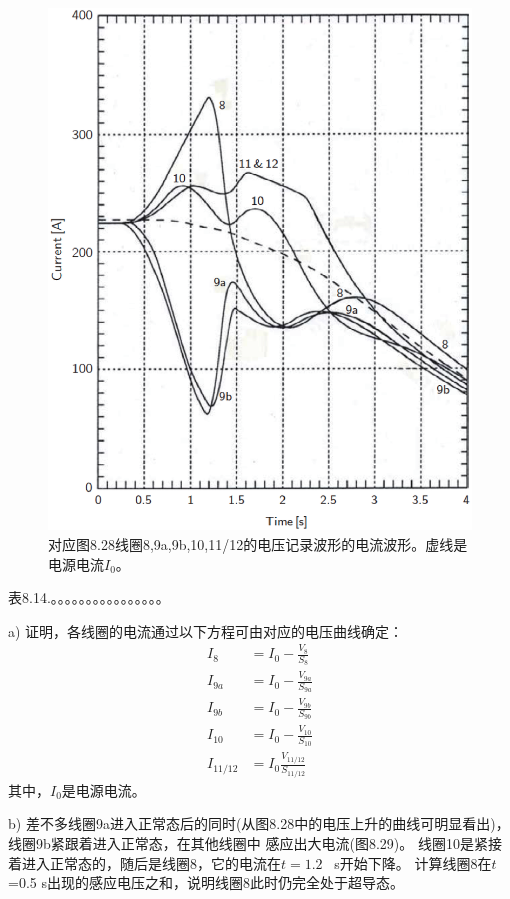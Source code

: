 \begin{figure}
	\centering
	\includegraphics[scale=0.4]{chpt8/figs/fig8.29.eps}
	\caption{对应图8.28线圈8,9a,9b,10,11/12的电压记录波形的电流波形。虚线是电源电流$I_0$。}
\end{figure}

表8.14.。。。。。。。。。。。。。。。。

a) 证明，各线圈的电流通过以下方程可由对应的电压曲线确定：
\begin{subequations}
	\begin{align}
I_8&=I_0-\frac{V_8}{S_8}\\
I_{9a}&=I_0-\frac{V_{9a}}{S_{9a}}\\
I_{9b}&=I_0-\frac{V_{9b}}{S_{9b}}\\
I_{10}&=I_0-\frac{V_{10}}{S_{10}}\\
I_{11/12}&=I_0\frac{V_{11/12}}{S_{11/12}}
	\end{align}
\end{subequations}
其中，$I_0$是电源电流。

b) 差不多线圈9a进入正常态后的同时(从图8.28中的电压上升的曲线可明显看出)，线圈9b紧跟着进入正常态，在其他线圈中
感应出大电流(图8.29)。
线圈10是紧接着进入正常态的，随后是线圈8，它的电流在$t=1.2$~ s开始下降。
计算线圈8在$t$=0.5 s出现的感应电压之和，说明线圈8此时仍完全处于超导态。

